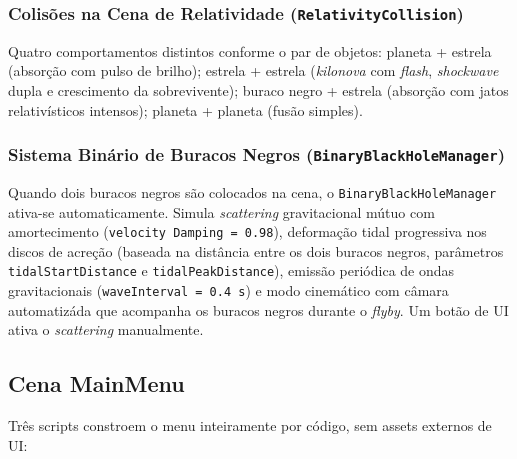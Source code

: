 \documentclass[12pt,a4paper]{article}
\begin{document}
\subsubsection{Colis\~{o}es na Cena de Relatividade (\texttt{RelativityCollision})}

Quatro comportamentos distintos conforme o par de objetos: planeta + estrela (absor\c{c}\~{a}o com pulso de brilho); estrela + estrela (\textit{kilonova} com \textit{flash}, \textit{shockwave} dupla e crescimento da sobrevivente); buraco negro + estrela (absor\c{c}\~{a}o com jatos relativ\'{i}sticos intensos); planeta + planeta (fus\~{a}o simples).

\subsubsection{Sistema Bin\'{a}rio de Buracos Negros (\texttt{BinaryBlackHoleManager})}

Quando dois buracos negros s\~{a}o colocados na cena, o \texttt{BinaryBlackHoleManager} ativa-se automaticamente. Simula \textit{scattering} gravitacional m\'{u}tuo com amortecimento (\texttt{velocity\ Damping = 0.98}), deforma\c{c}\~{a}o tidal progressiva nos discos de acre\c{c}\~{a}o (baseada na dist\^{a}ncia entre os dois buracos negros, par\^{a}metros \texttt{tidalStartDistance} e \texttt{tidalPeakDistance}), emiss\~{a}o peri\'{o}dica de ondas gravitacionais (\texttt{waveInterval = 0.4\,s}) e modo cinem\'{a}tico com c\^{a}mara automatiz\'{a}da que acompanha os buracos negros durante o \textit{flyby}.\cite{bjerrumbohr2026resumming} Um bot\~{a}o de UI ativa o \textit{scattering} manualmente.

\subsection{Cena MainMenu}

Tr\^{e}s scripts constroem o menu inteiramente por c\'{o}digo, sem assets externos de UI:
\end{document}
